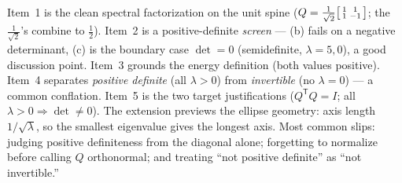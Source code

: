 \documentclass[10pt]{article}
\newcommand{\T}{\mathsf{T}}
\begin{document}
\begin{teachernote}
Item~1 is the clean spectral factorization on the unit spine ($Q=\frac{1}{\sqrt2}\begin{bsmallmatrix}1&1\\1&-1\end{bsmallmatrix}$;
the $\frac1{\sqrt2}$'s combine to $\frac12$). Item~2 is a positive-definite \emph{screen} --- (b) fails on a
negative determinant, (c) is the boundary case $\det=0$ (semidefinite, $\lambda=5,0$), a good discussion
point. Item~3 grounds the energy definition (both values positive). Item~4 separates \emph{positive
definite} (all $\lambda>0$) from \emph{invertible} (no $\lambda=0$) --- a common conflation. Item~5 is the
two target justifications ($Q^{\T}Q=I$; all $\lambda>0\Rightarrow\det\ne0$). The extension previews the
ellipse geometry: axis length $1/\sqrt\lambda$, so the smallest eigenvalue gives the longest axis. Most
common slips: judging positive definiteness from the diagonal alone; forgetting to normalize before calling
$Q$ orthonormal; and treating ``not positive definite'' as ``not invertible.''
\end{teachernote}
\end{document}
